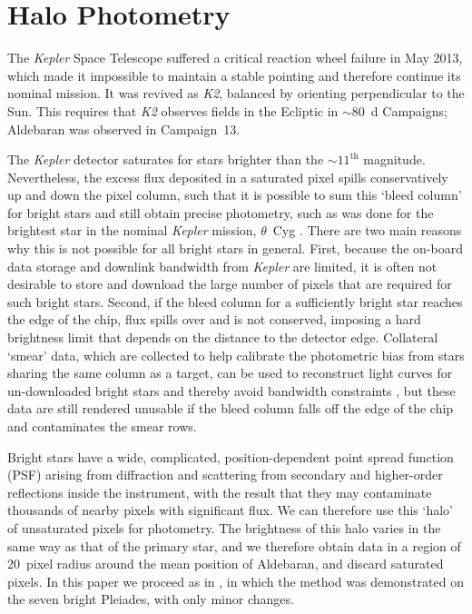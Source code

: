 \documentclass[modern]{aastex61}
\newcommand{\kepler}{\emph{Kepler}\xspace}
\newcommand{\ktwo}{\emph{K2}\xspace}
\begin{document}
\section{Halo Photometry}
\label{halo}

The \kepler Space Telescope \citep{2010sci...327..977b}
suffered a critical reaction wheel failure in May 2013, which made it impossible to maintain a stable pointing and therefore continue its nominal mission. It was revived as \ktwo \citep{howell14}, balanced by orienting perpendicular to the Sun. This requires that \ktwo observes fields in the Ecliptic in $\sim80$~d Campaigns; Aldebaran was observed in Campaign~13.

The \kepler detector saturates for stars brighter than the $\sim11^\text{th}$ magnitude. Nevertheless, the excess flux deposited in a saturated pixel spills conservatively up and down the pixel column, such that it is possible to sum this `bleed column' for bright stars and still obtain precise photometry, such as was done for the brightest star in the nominal \kepler mission, $\theta$~Cyg \citep[$V = 4.48$;][]{guzik2011,thetacygwhite,guzik2016}. There are two main reasons why this is not possible for all bright stars in general. First, because the on-board data storage and downlink bandwidth from \kepler are limited, it is often not desirable to store and download the large number of pixels that are required for such bright stars. Second, if the bleed column for a sufficiently bright star reaches the edge of the chip, flux spills over and is not conserved, imposing a hard brightness limit that depends on the distance to the detector edge.
Collateral `smear' data, which are collected to help calibrate the photometric bias from stars sharing the same column as a target, can be used to reconstruct light curves for un-downloaded bright stars and thereby avoid bandwidth constraints \citep{k2smear}, but these data are still rendered unusable if the bleed column falls off the edge of the chip and contaminates the smear rows.

Bright stars have a wide, complicated, position-dependent point spread function (PSF) arising from diffraction and scattering from secondary and higher-order reflections inside the instrument, with the result that they may contaminate thousands of nearby pixels with significant flux. We can therefore use this `halo' of unsaturated pixels for photometry. The brightness of this halo varies in the same way as that of the primary star, and we therefore obtain data in a region of 20~pixel radius around the mean position of Aldebaran, and discard saturated pixels.
In this paper we proceed as in \citet{White2017}, in which the method was demonstrated on the seven bright Pleiades, with only minor changes.
\end{document}
